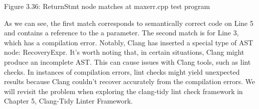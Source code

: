 \begin{center}
Figure 3.36: ReturnStmt node matches at maxerr.cpp test program
\end{center}

As we can see, the first match corresponds to semantically correct code on Line 5 and contains a reference to the a parameter. The second match is for Line 3, which has a compilation error. Notably, Clang has inserted a special type of AST node: RecoveryExpr. It's worth noting that, in certain situations, Clang might produce an incomplete AST. This can cause issues with Clang tools, such as lint checks. In instances of compilation errors, lint checks might yield unexpected results because Clang couldn't recover accurately from the compilation errors. We will revisit the problem when exploring the clang-tidy lint check framework in Chapter 5, Clang-Tidy Linter Framework.




















































































